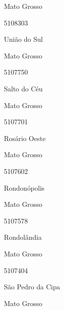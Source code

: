 \documentclass[
  letterpaper,
]{report}
\begin{document}
\n    

\n    

\n      

Mato Grosso

\n      

5108303

\n      

União do Sul

\n    

\n    

\n      

Mato Grosso

\n      

5107750

\n      

Salto do Céu

\n    

\n    

\n      

Mato Grosso

\n      

5107701

\n      

Rosário Oeste

\n    

\n    

\n      

Mato Grosso

\n      

5107602

\n      

Rondonópolis

\n    

\n    

\n      

Mato Grosso

\n      

5107578

\n      

Rondolândia

\n    

\n    

\n      

Mato Grosso

\n      

5107404

\n      

São Pedro da Cipa

\n    

\n    

\n      

Mato Grosso
\end{document}
